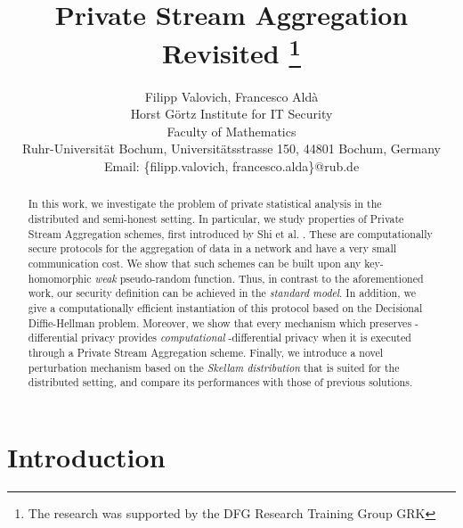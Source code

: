 \documentclass[10pt]{extarticle}
\title{Private Stream Aggregation Revisited
\thanks{The research was supported by the DFG Research Training Group GRK }
}
\author{
Filipp Valovich, Francesco Ald\`{a}\\ Horst G\"{o}rtz Institute for IT Security\\ Faculty of Mathematics\\ Ruhr-Universit\"{a}t Bochum, Universit\"{a}tsstrasse 150, 44801 Bochum, Germany\\ Email: \{filipp.valovich, francesco.alda\}@rub.de
}
\date{}
\begin{document}
\maketitle

\pagestyle{empty}



\begin{abstract} \noindent In this work, we investigate the problem of private statistical analysis in the distributed and semi-honest setting. In particular, we study properties of Private Stream Aggregation schemes, first introduced by Shi et al. \cite{2}. These are computationally secure protocols for the aggregation of data in a network and have a very small communication cost. We show that such schemes can be built upon any key-homomorphic \textit{weak} pseudo-random function. Thus, in contrast to the aforementioned work, our security definition can be achieved in the \textit{standard model}. In addition, we give a computationally efficient instantiation of this protocol based on the Decisional Diffie-Hellman problem. 
Moreover, we show that every mechanism which preserves -differential privacy provides \textit{computational} -differential privacy when it is executed through a Private Stream Aggregation scheme. Finally, we introduce a novel perturbation mechanism based on the \textit{Skellam distribution} that is suited for the distributed setting, and compare its performances with those of previous solutions.
\end{abstract}

\section{Introduction}
\end{document}
